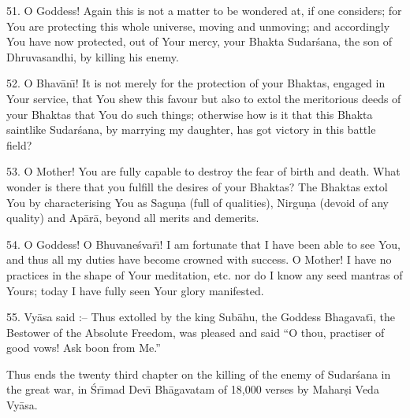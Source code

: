 51. O Goddess! Again this is not a matter to be wondered at, if one considers; for You are protecting this whole universe, moving and unmoving; and accordingly You have now protected, out of Your mercy, your Bhakta Sudar\'sana, the son of Dhruvasandhi, by killing his enemy.

52. O Bhav\=an\={\i}! It is not merely for the protection of your Bhaktas, engaged in Your service, that You shew this favour but also to extol the meritorious deeds of your Bhaktas that You do such things; otherwise how is it that this Bhakta saintlike Sudar\'sana, by marrying my daughter, has got victory in this battle field?

53. O Mother! You are fully capable to destroy the fear of birth and death. What wonder is there that you fulfill the desires of your Bhaktas? The Bhaktas extol You by characterising You as Sagu\d{n}a (full of qualities), Nirgu\d{n}a (devoid of any quality) and Ap\=ar\=a, beyond all merits and demerits.

54. O Goddess! O Bhuvane\'svar\={\i}! I am fortunate that I have been able to see You, and thus all my duties have become crowned with success. O Mother! I have no practices in the shape of Your meditation, etc. nor do I know any seed mantras of Yours; today I have fully seen Your glory manifested.

55. Vy\=asa said :-- Thus extolled by the king Sub\=ahu, the Goddess Bhagavat\={\i}, the Bestower of the Absolute Freedom, was pleased and said ``O thou, practiser of good vows! Ask boon from Me.''

Thus ends the twenty third chapter on the killing of the enemy of Sudar\'sana in the great war, in \'Sr\={\i}mad Dev\={\i} Bh\=agavatam of 18,000 verses by Mahar\d{s}i Veda Vy\=asa.



